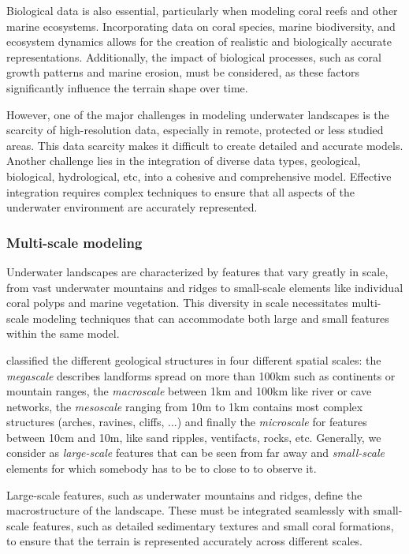 Biological data is also essential, particularly when modeling coral reefs and other marine ecosystems. Incorporating data on coral species, marine biodiversity, and ecosystem dynamics allows for the creation of realistic and biologically accurate representations. Additionally, the impact of biological processes, such as coral growth patterns and marine erosion, must be considered, as these factors significantly influence the terrain shape over time.

However, one of the major challenges in modeling underwater landscapes is the scarcity of high-resolution data, especially in remote, protected or less studied areas. This data scarcity makes it difficult to create detailed and accurate models. Another challenge lies in the integration of diverse data types, geological, biological, hydrological, etc, into a cohesive and comprehensive model. Effective integration requires complex techniques to ensure that all aspects of the underwater environment are accurately represented.

\subsubsection{Multi-scale modeling}

Underwater landscapes are characterized by features that vary greatly in scale, from vast underwater mountains and ridges to small-scale elements like individual coral polyps and marine vegetation. This diversity in scale necessitates multi-scale modeling techniques that can accommodate both large and small features within the same model.

\citep{ParisThesis} classified the different geological structures in four different spatial scales: the \textit{megascale} describes landforms spread on more than \si{100}{km} such as continents or mountain ranges, the \textit{macroscale} between \si{1}{km} and \si{100}{km} like river or cave networks, the \textit{mesoscale} ranging from \si{10}{m} to \si{1}{km} contains most complex structures (arches, ravines, cliffs, ...) and finally the \textit{microscale} for features between \si{10}{cm} and \si{10}{m}, like sand ripples, ventifacts, rocks, etc. Generally, we consider as \textit{large-scale} features that can be seen from far away and \textit{small-scale} elements for which somebody has to be to close to to observe it.

Large-scale features, such as underwater mountains and ridges, define the macrostructure of the landscape. These must be integrated seamlessly with small-scale features, such as detailed sedimentary textures and small coral formations, to ensure that the terrain is represented accurately across different scales.

